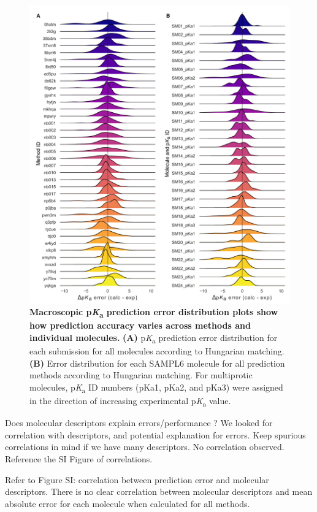 \documentclass[9pt,lineno,final]{elife}
\newcommand{\pKa}{p\textit{K}\textsubscript{a}}
\begin{document}
\begin{figure}
\centering
\includegraphics[width=0.8\linewidth]{figures/typeIII-error-distribution.pdf}
\caption{{\bf Macroscopic \pKa{} prediction error distribution plots show how prediction accuracy varies across methods and individual molecules.}
{\bf(A)} \pKa{} prediction error distribution for each submission for all molecules according to Hungarian matching. {\bf(B)} Error distribution for each SAMPL6 molecule for all prediction methods according to Hungarian matching. For multiprotic molecules, \pKa{} ID numbers (pKa1, pKa2, and pKa3) were assigned in the direction of increasing experimental \pKa{} value. 
}
\label{fig:typeIII-error-distribution}
\end{figure}





Does molecular descriptors explain errors/performance ?
We looked for correlation with descriptors, and potential explanation for errors. Keep spurious correlations in mind if we have many descriptors. No correlation observed. Reference the SI Figure of correlations.


Refer to Figure SI: correlation between prediction error and molecular descriptors. There is no clear correlation between molecular descriptors and mean absolute error for each molecule when calculated for all methods.  
\end{document}
